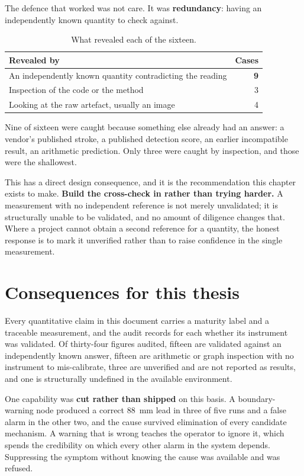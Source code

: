 The defence that worked was not care. It was \textbf{redundancy}: having an
independently known quantity to check against.

\begin{table}[htbp]
  \centering
  \caption{What revealed each of the sixteen.}
  \label{tab:caught}
  \begin{tabular}{@{}lr@{}}
    \toprule
    Revealed by & Cases \\
    \midrule
    An independently known quantity contradicting the reading & \textbf{9} \\
    Inspection of the code or the method & 3 \\
    Looking at the raw artefact, usually an image & 4 \\
    \bottomrule
  \end{tabular}
\end{table}

Nine of sixteen were caught because something else already had an answer: a
vendor's published stroke, a published detection score, an earlier
incompatible result, an arithmetic prediction. Only three were caught by
inspection, and those were the shallowest.

This has a direct design consequence, and it is the recommendation this
chapter exists to make. \textbf{Build the cross-check in rather than trying
harder.} A measurement with no independent reference is not merely
unvalidated; it is structurally unable to be validated, and no amount of
diligence changes that. Where a project cannot obtain a second reference for a
quantity, the honest response is to mark it unverified rather than to raise
confidence in the single measurement.

\section{Consequences for this thesis}

Every quantitative claim in this document carries a maturity label and a
traceable measurement, and the audit records for each whether its instrument
was validated. Of thirty-four figures audited, fifteen are validated against an
independently known answer, fifteen are arithmetic or graph inspection with no
instrument to mis-calibrate, three are unverified and are not reported as
results, and one is structurally undefined in the available environment.

One capability was \textbf{cut rather than shipped} on this basis. A
boundary-warning node produced a correct \SI{88}{\milli\metre} lead in three of
five runs and a false alarm in the other two, and the cause survived
elimination of every candidate mechanism. A warning that is wrong teaches the
operator to ignore it, which spends the credibility on which every other alarm
in the system depends. Suppressing the symptom without knowing the cause was
available and was refused.

